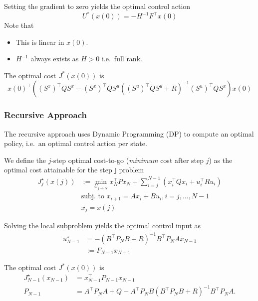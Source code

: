 \newpar{}

Setting the gradient to zero yields the optimal control action
\noindent\begin{equation*}
    U^*(x(0)) = -H^{-1}F^\top x(0)
\end{equation*}
Note that
\begin{itemize}
    \item This is linear in $x(0)$.
    \item $H^{-1}$ always exists as $H>0$ i.e.\ full rank.
\end{itemize}

The optimal cost $J^*(x(0))$ is
    {\footnotesize
        \noindent\begin{equation*}
            {x(0)}^{\top}\left({(S^{x})}^{\top}\overline{Q}S^{x}-{(S^{x})}^{\top}\overline{Q}S^{u}{({(S^{u})}^{\top}\overline{Q}S^{u}+\overline{R})}^{-1}{(S^{u})}^{\top}\overline{Q}S^{x}\right)x(0)
        \end{equation*}
    }

\subsubsection{Recursive Approach}
The recursive approach uses Dynamic Programming (DP) to compute an optimal policy, i.e.\ an optimal control action per state.

\newpar{}

We define the $j$-step optimal cost-to-go (\textit{minimum} cost after step $j$) as the optimal cost attainable for the step j problem
\noindent\begin{align*}
    J_j^\star(x(j)) & :=\min_{U_{j\to N}}x_N^\top Px_N+\sum_{i=j}^{N-1}(x_i^\top Qx_i+u_i^\top Ru_i) \\
                    & \text{subj.\ to }x_{i+1}=Ax_i+Bu_i,i=j,...,N-1                                 \\
                    & x_j=x(j)
\end{align*}

\newpar{}

Solving the local subproblem yields the optimal control input as
\noindent\begin{equation*}
    \begin{aligned}
        u_{N-1}^{\star} & =-(B^\top P_NB+R)^{-1}B^\top P_NAx_{N-1} \\
                        & :=F_{N-1}x_{N-1}
    \end{aligned}
\end{equation*}

The optimal cost $J^*(x(0))$ is
    {\small
        \noindent\begin{align*}
            J_{N-1}^{\star}(x_{N-1}) & =x_{N-1}^{\top}P_{N-1}x_{N-1}                                    \\
            P_{N-1}                  & =A^\top P_N A+Q-A^\top P_N B{(B^\top P_N B+R)}^{-1}B^\top P_N A.
        \end{align*}
    }
